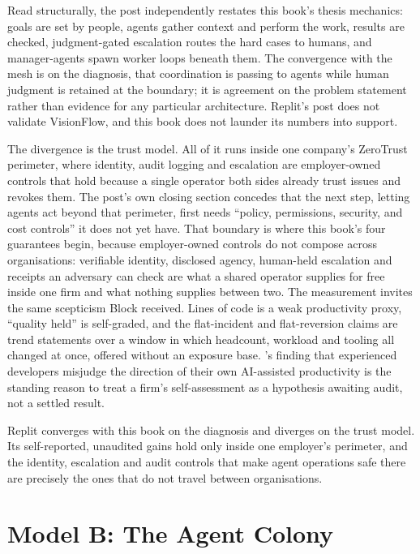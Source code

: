Read structurally, the post independently restates this book's thesis mechanics: goals are set by people, agents gather context and perform the work, results are checked, judgment-gated escalation routes the hard cases to humans, and manager-agents spawn worker loops beneath them. The convergence with the mesh is on the diagnosis, that coordination is passing to agents while human judgment is retained at the boundary; it is agreement on the problem statement rather than evidence for any particular architecture. Replit's post does not validate VisionFlow, and this book does not launder its numbers into support.

The divergence is the trust model. All of it runs inside one company's ZeroTrust perimeter, where identity, audit logging and escalation are employer-owned controls that hold because a single operator both sides already trust issues and revokes them. The post's own closing section concedes that the next step, letting agents act beyond that perimeter, first needs ``policy, permissions, security, and cost controls'' it does not yet have. That boundary is where this book's four guarantees begin, because employer-owned controls do not compose across organisations: verifiable identity, disclosed agency, human-held escalation and receipts an adversary can check are what a shared operator supplies for free inside one firm and what nothing supplies between two. The measurement invites the same scepticism Block received. Lines of code is a weak productivity proxy, ``quality held'' is self-graded, and the flat-incident and flat-reversion claims are trend statements over a window in which headcount, workload and tooling all changed at once, offered without an exposure base. \textcite{METR2025DevRCT}'s finding that experienced developers misjudge the direction of their own AI-assisted productivity is the standing reason to treat a firm's self-assessment as a hypothesis awaiting audit, not a settled result.

\begin{cautionbox}
Replit converges with this book on the diagnosis and diverges on the trust model. Its self-reported, unaudited gains hold only inside one employer's perimeter, and the identity, escalation and audit controls that make agent operations safe there are precisely the ones that do not travel between organisations.
\end{cautionbox}

\section{Model B: The Agent Colony}

